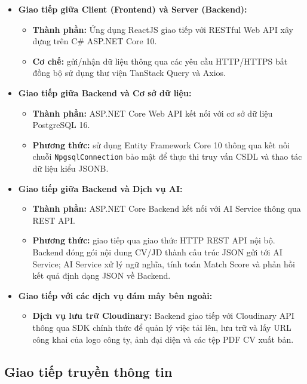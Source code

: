 \begin{itemize}
    \item \textbf{Giao tiếp giữa Client (Frontend) và Server (Backend):}
    \begin{itemize}
        \item \textbf{Thành phần:} Ứng dụng ReactJS giao tiếp với RESTful Web API xây dựng trên C\# ASP.NET Core 10.
        \item \textbf{Cơ chế:} gửi/nhận dữ liệu thông qua các yêu cầu HTTP/HTTPS bất đồng bộ sử dụng thư viện TanStack Query và Axios.
    \end{itemize}

    \item \textbf{Giao tiếp giữa Backend và Cơ sở dữ liệu:}
    \begin{itemize}
        \item \textbf{Thành phần:} ASP.NET Core Web API kết nối với cơ sở dữ liệu PostgreSQL 16.
        \item \textbf{Phương thức:} sử dụng Entity Framework Core 10 thông qua kết nối chuỗi \texttt{NpgsqlConnection} bảo mật để thực thi truy vấn CSDL và thao tác dữ liệu kiểu JSONB.
    \end{itemize}

    \item \textbf{Giao tiếp giữa Backend và Dịch vụ AI:}
    \begin{itemize}
        \item \textbf{Thành phần:} ASP.NET Core Backend kết nối với AI Service thông qua REST API.
        \item \textbf{Phương thức:} giao tiếp qua giao thức HTTP REST API nội bộ. Backend đóng gói nội dung CV/JD thành cấu trúc JSON gửi tới AI Service; AI Service xử lý ngữ nghĩa, tính toán Match Score và phản hồi kết quả định dạng JSON về Backend.
    \end{itemize}

    \item \textbf{Giao tiếp với các dịch vụ đám mây bên ngoài:}
    \begin{itemize}
        \item \textbf{Dịch vụ lưu trữ Cloudinary:} Backend giao tiếp với Cloudinary API thông qua SDK chính thức để quản lý việc tải lên, lưu trữ và lấy URL công khai của logo công ty, ảnh đại diện và các tệp PDF CV xuất bản.
    \end{itemize}
\end{itemize}

\subsection{Giao tiếp truyền thông tin}

